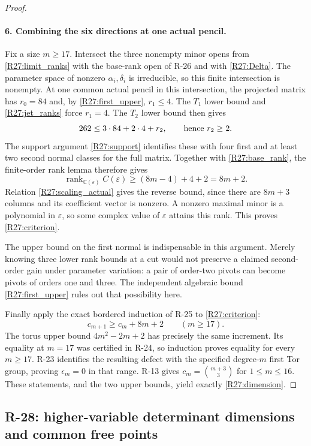 \begin{proof}
\paragraph{6. Combining the six directions at one actual pencil.}
Fix a size $m\geq17$. Intersect the three nonempty minor opens
from \eqref{R27:limit_ranks} with the base-rank open of R-26
and with \eqref{R27:Delta}. The parameter space of nonzero
$\alpha_i,\delta_i$ is irreducible, so this finite intersection
is nonempty. At one common actual pencil in this intersection,
the projected matrix has $r_0=84$ and, by
\eqref{R27:first_upper}, $r_1\leq4$. The $T_1$ lower bound
and \eqref{R27:jet_ranks} force $r_1=4$.
The $T_2$ lower bound then gives
\[
 262\leq3\cdot84+2\cdot4+r_2,
 \qquad\hbox{hence }r_2\geq2.
\]
The support argument \eqref{R27:support} identifies these with
four first and at least two second normal classes for the full
matrix. Together with \eqref{R27:base_rank}, the finite-order
rank lemma therefore gives
\[
 \operatorname{rank}_{\mathbb C(\varepsilon)}C(\varepsilon)
       \geq(8m-4)+4+2=8m+2.
\]
Relation \eqref{R27:scaling_actual} gives the reverse bound,
since there are $8m+3$ columns and its coefficient vector is
nonzero. A nonzero maximal minor is a polynomial in
$\varepsilon$, so some complex value of $\varepsilon$ attains
this rank. This proves \eqref{R27:criterion}.

The upper bound on the first normal is indispensable in this
argument. Merely knowing three lower rank bounds at a cut
would not preserve a claimed second-order gain under parameter
variation: a pair of order-two pivots can become pivots of
orders one and three. The independent algebraic bound
\eqref{R27:first_upper} rules out that possibility here.

Finally apply the exact bordered induction of R-25 to
\eqref{R27:criterion}:
\[
 c_{m+1}\geq c_m+8m+2\qquad(m\geq17).
\]
The torus upper bound $4m^2-2m+2$ has precisely the same
increment. Its equality at $m=17$ was certified in R-24,
so induction proves equality for every $m\geq17$.
R-23 identifies the resulting defect with the specified
degree-$m$ first Tor group, proving $\epsilon_m=0$ in that
range. R-13 gives $c_m=\binom{m+3}{3}$ for $1\leq m\leq16$.
These statements, and the two upper bounds, yield exactly
\eqref{R27:dimension}.
\end{proof}


\subsection{R-28: higher-variable determinant dimensions and common free points}

